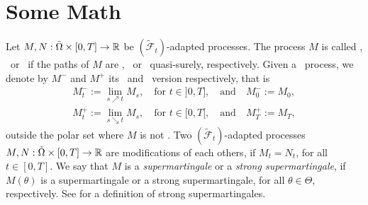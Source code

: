 \documentclass[DIV=classic,a4paper]{artclcomp}
\begin{document}
\section{Some Math}
Let $M, N:\tilde{\Omega}\times [0,T]\to \mathbb{R}$ be $(\tilde{\mathcal{F}}_t)$-adapted processes.
The process $M$ is called \cadlag, \caglad~or \ladlag~if the paths of $M$ are  \cadlag, \caglad~or \ladlag~quasi-surely, respectively.
Given a \ladlag~process, we denote by $M^-$ and $M^+$ its \caglad~and \cadlag~version respectively, that is
\begin{gather*}
	M^-_t:=\lim_{s\nearrow t}M_s,\quad \text{for }t \in ]0,T],\quad\text{and}\quad M^-_0:=M_0,\\
	M^+_t:=\lim_{s\searrow t}M_s,\quad \text{for }t \in [0,T[,\quad\text{and}\quad M^+_T:=M_T,
\end{gather*}
outside the polar set where $M$ is not \ladlag.
Two $(\tilde{\mathcal{F}}_t)$-adapted processes $M,N:\tilde{\Omega}\times [0,T]\to \mathbb{R}$ are modifications of each others, if $M_t=N_t$, for all $t \in [0,T]$.
We say that $M$ is a \emph{supermartingale} or a \emph{strong supermartingale}, if $M(\theta)$ is a supermartingale or a strong supermartingale, for all $\theta \in \Theta$, respectively.
See \cite[Appendix I]{Dellacherie1982} for a definition of strong supermartingales.
\end{document}
